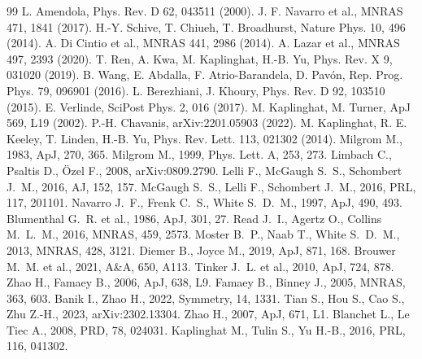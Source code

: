 \documentclass[11pt]{article}
\begin{document}
\begin{thebibliography}{99}\small
{} L. Amendola, Phys. Rev. D 62, 043511 (2000).
 J. F. Navarro et al., MNRAS 471, 1841 (2017).
 H.-Y. Schive, T. Chiueh, T. Broadhurst, Nature Phys. 10, 496 (2014).
 A. Di Cintio et al., MNRAS 441, 2986 (2014).
 A. Lazar et al., MNRAS 497, 2393 (2020).
 T. Ren, A. Kwa, M. Kaplinghat, H.-B. Yu, Phys. Rev. X 9, 031020 (2019).
 B. Wang, E. Abdalla, F. Atrio-Barandela, D. Pav\'on, Rep. Prog. Phys. 79, 096901 (2016).
 L. Berezhiani, J. Khoury, Phys. Rev. D 92, 103510 (2015).
 E. Verlinde, SciPost Phys. 2, 016 (2017).
 M. Kaplinghat, M. Turner, ApJ 569, L19 (2002).
 P.-H. Chavanis, arXiv:2201.05903 (2022).
 M. Kaplinghat, R. E. Keeley, T. Linden, H.-B. Yu, Phys. Rev. Lett. 113, 021302 (2014).
 Milgrom M., 1983, ApJ, 270, 365.
 Milgrom M., 1999, Phys. Lett. A, 253, 273.
 Limbach C., Psaltis D., \"Ozel F., 2008, arXiv:0809.2790.
 Lelli F., McGaugh S.~S., Schombert J.~M., 2016, AJ, 152, 157.
 McGaugh S.~S., Lelli F., Schombert J.~M., 2016, PRL, 117, 201101.
 Navarro J.~F., Frenk C.~S., White S.~D.~M., 1997, ApJ, 490, 493.
 Blumenthal G.~R. et al., 1986, ApJ, 301, 27.
 Read J.~I., Agertz O., Collins M.~L.~M., 2016, MNRAS, 459, 2573.
 Moster B.~P., Naab T., White S.~D.~M., 2013, MNRAS, 428, 3121.
 Diemer B., Joyce M., 2019, ApJ, 871, 168.
 Brouwer M.~M. et al., 2021, A\&A, 650, A113.
 Tinker J.~L. et al., 2010, ApJ, 724, 878.
 Zhao H., Famaey B., 2006, ApJ, 638, L9.
 Famaey B., Binney J., 2005, MNRAS, 363, 603.
 Banik I., Zhao H., 2022, Symmetry, 14, 1331.
 Tian S., Hou S., Cao S., Zhu Z.-H., 2023, arXiv:2302.13304.
 Zhao H., 2007, ApJ, 671, L1.
 Blanchet L., Le Tiec A., 2008, PRD, 78, 024031.
 Kaplinghat M., Tulin S., Yu H.-B., 2016, PRL, 116, 041302.
\end{thebibliography}
\end{document}
